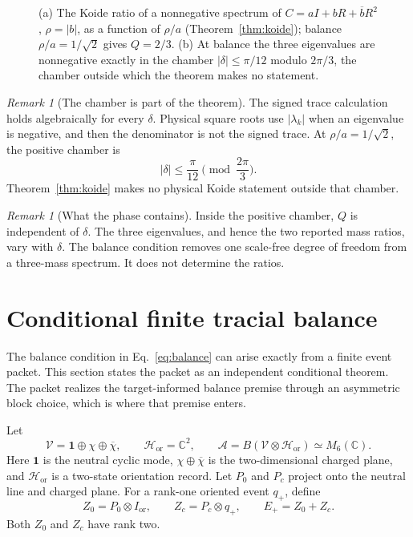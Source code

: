 \documentclass[11pt]{article}
\theoremstyle{remark}
\newtheorem{remark}[theorem]{Remark}
\newcommand{\C}{\mathbb C}
\newcommand{\one}{\mathbf 1}
\begin{document}
\begin{figure}[!htb]
\centering

\caption{(a) The Koide ratio of a nonnegative spectrum of $C=aI+bR+\overline bR^2$, $\rho=|b|$, as a function of $\rho/a$ (Theorem~\ref{thm:koide}); balance $\rho/a=1/\sqrt2$ gives $Q=2/3$. (b) At balance the three eigenvalues are nonnegative exactly in the chamber $|\delta|\le\pi/12$ modulo $2\pi/3$, the chamber outside which the theorem makes no statement.}
\label{fig:koide}
\end{figure}
\begin{remark}[The chamber is part of the theorem]
The signed trace calculation holds algebraically for every \(\delta\).
Physical square roots use \(|\lambda_k|\) when an eigenvalue is negative, and
then the denominator is not the signed trace. At
\(\rho/a=1/\sqrt2\), the positive chamber is
\[
|\delta|\leq\frac{\pi}{12}\pmod{\frac{2\pi}{3}}.
\]
Theorem~\ref{thm:koide} makes no physical Koide statement outside that
chamber.
\end{remark}

\begin{remark}[What the phase contains]
Inside the positive chamber, \(Q\) is independent of \(\delta\). The three
eigenvalues, and hence the two reported mass ratios, vary with \(\delta\).
The balance condition removes one scale-free degree of freedom from a
three-mass spectrum. It does not determine the ratios.
\end{remark}

\section{Conditional finite tracial balance}

The balance condition in Eq.~\eqref{eq:balance} can arise exactly from a
finite event packet. This section states the packet as an independent
conditional theorem. The packet realizes the target-informed balance
premise through an asymmetric block choice, which is where that premise
enters.

Let
\[
\mathcal V=\one\oplus\chi\oplus\overline\chi,
\qquad
\mathcal H_{\mathrm{or}}=\C^2,
\qquad
\mathcal A=B(\mathcal V\otimes\mathcal H_{\mathrm{or}})
\simeq M_6(\C).
\]
Here \(\one\) is the neutral cyclic mode, \(\chi\oplus\overline\chi\) is the
two-dimensional charged plane, and \(\mathcal H_{\mathrm{or}}\) is a
two-state orientation record. Let \(P_0\) and \(P_c\) project onto the neutral
line and charged plane. For a rank-one oriented event \(q_+\), define
\[
Z_0=P_0\otimes I_{\mathrm{or}},
\qquad
Z_c=P_c\otimes q_+,
\qquad
E_+=Z_0+Z_c.
\]
Both \(Z_0\) and \(Z_c\) have rank two.
\end{document}
